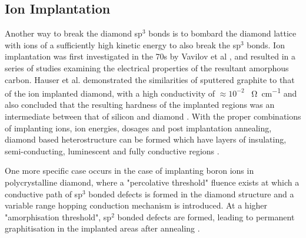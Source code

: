 \begin{refsection}
\subsection{Ion Implantation}
Another way to break the diamond sp$^{3}$ bonds is to bombard the diamond lattice with ions of a sufficiently high kinetic energy to also break the sp$^{3}$ bonds. Ion implantation was first investigated in the 70s by Vavilov et al \cite{vavilov:1973}, and resulted in a series of studies examining the electrical properties of the resultant amorphous carbon. Hauser et al. demonstrated the similarities of sputtered graphite to that of the ion implanted diamond, with a high conductivity of $\approx10^{-2}$ \si{\per\ohm\per\centi\metre} and also concluded that the resulting hardness of the implanted regions was an intermediate between that of silicon and diamond \cite{hauser:1976,hauser:1977}. With the proper combinations of implanting ions, ion energies, dosages and post implantation annealing, diamond based heterostructure can be formed which have layers of insulating, semi-conducting, luminescent and fully conductive regions \cite{gippius:1999,prins:1983,prins:1985}. 

One more specific case occurs in the case of implanting boron ions in polycrystalline diamond, where a "percolative threshold" fluence exists at which a conductive path of sp$^{3}$ bonded defects is formed in the diamond structure and a variable range hopping conduction mechanism is introduced. At a higher "amorphisation threshold", sp$^{2}$ bonded defects are formed, leading to permanent graphitisation in the implanted areas after annealing \cite{fontaine:1995}.


\end{refsection}
